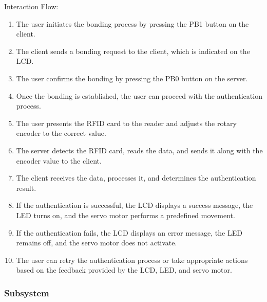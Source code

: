 \documentclass[a4paper,11pt]{article}%
\begin{document}
Interaction Flow:
\begin{enumerate}
    \item The user initiates the bonding process by pressing the PB1 button on the client.
    \item The client sends a bonding request to the client, which is indicated on the LCD.
    \item The user confirms the bonding by pressing the PB0 button on the server.
    \item Once the bonding is established, the user can proceed with the authentication process.
    \item The user presents the RFID card to the reader and adjusts the rotary encoder to the correct value.
    \item The server detects the RFID card, reads the data, and sends it along with the encoder value to the client.
    \item The client receives the data, processes it, and determines the authentication result.
    \item If the authentication is successful, the LCD displays a success message, the LED turns on, and the servo motor performs a predefined movement.
    \item If the authentication fails, the LCD displays an error message, the LED remains off, and the servo motor does not activate.
    \item The user can retry the authentication process or take appropriate actions based on the feedback provided by the LCD, LED, and servo motor.
\end{enumerate}





\subsubsection{Subsystem}
\end{document}
